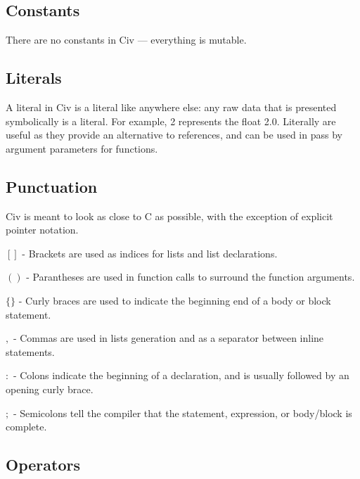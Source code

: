 \documentclass[a4paper]{article}
\begin{document}
\subsection{Constants}

There are no constants in Civ — everything is mutable.

\subsection{Literals}

A literal in Civ is a literal like anywhere else: any raw data that is presented symbolically is a literal. For example, 2 represents the float 2.0. Literally are useful as they provide an alternative to references, and can be used in pass by argument parameters for functions.

\subsection{Punctuation}

Civ is meant to look as close to C as possible, with the exception of explicit pointer notation.

\begin{description}
	\item{$[]$} - Brackets are used as indices for lists and list declarations.
	\item{$()$} - Parantheses are used in function calls to surround the function arguments.
    \item{$\{\}$} - Curly braces are used to indicate the beginning end of a body or block statement.
    \item{$,$} - Commas are used in lists generation and as a separator between inline statements.
    \item{$:$} - Colons indicate the beginning of a declaration, and is usually followed by an opening curly brace.
    \item{$;$} - Semicolons tell the compiler that the statement, expression, or body/block is complete.
\end{description}

\subsection{Operators}
\end{document}

